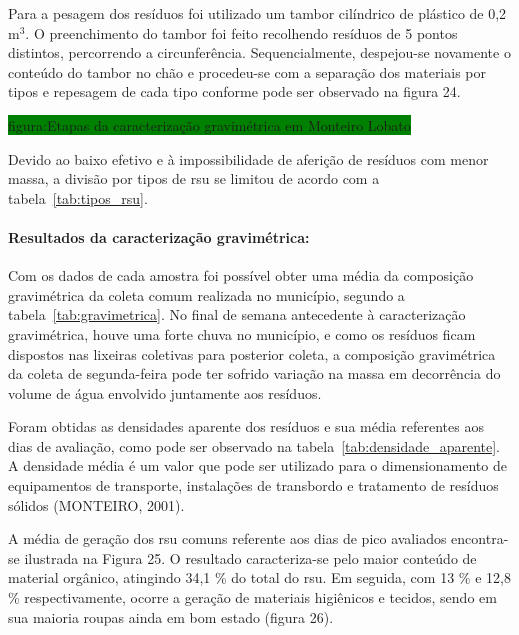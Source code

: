 	Para a pesagem dos resíduos foi utilizado um tambor cilíndrico de plástico de 0,2 m$^{3}$. O preenchimento do tambor foi feito recolhendo resíduos de 5 pontos distintos, percorrendo a circunferência. Sequencialmente, despejou-se novamente o conteúdo do tambor no chão e procedeu-se com a separação dos materiais por tipos e repesagem de cada tipo conforme pode ser observado na figura 24.
	
	\colorbox{green}{figura:Etapas da caracterização gravimétrica em Monteiro Lobato}
	
	Devido ao baixo efetivo e à impossibilidade de aferição de resíduos com menor massa, a divisão por tipos de \gls{rsu} se limitou de acordo com a tabela~\ref{tab:tipos_rsu}.
	
		
	
	
	\paragraph{\textbf{Resultados da caracterização gravimétrica:}}
	
	Com os dados de cada amostra foi possível obter uma média da composição gravimétrica da coleta comum realizada no município, segundo a tabela~\ref{tab:gravimetrica}. No final de semana antecedente à caracterização gravimétrica, houve uma forte chuva no município, e como os resíduos ficam dispostos nas lixeiras coletivas para posterior coleta, a composição gravimétrica da coleta de segunda-feira pode ter sofrido variação na massa em decorrência do volume de água envolvido juntamente aos resíduos.
	
	
	
		
	Foram obtidas as densidades aparente dos resíduos e sua média referentes aos dias de avaliação, como pode ser observado na tabela~\ref{tab:densidade_aparente}. A densidade média é um valor que pode ser utilizado para o dimensionamento de equipamentos de transporte, instalações de transbordo e tratamento de resíduos sólidos (MONTEIRO, 2001).
	
	
	
	A média de geração dos \gls{rsu} comuns referente aos dias de pico avaliados encontra-se ilustrada na Figura 25. O resultado caracteriza-se pelo maior conteúdo de material orgânico, atingindo 34,1 \% do total do \gls{rsu}. Em seguida, com 13 \% e 12,8 \% respectivamente, ocorre a geração de materiais higiênicos e tecidos, sendo em sua maioria roupas ainda em bom estado (figura 26). 
	
